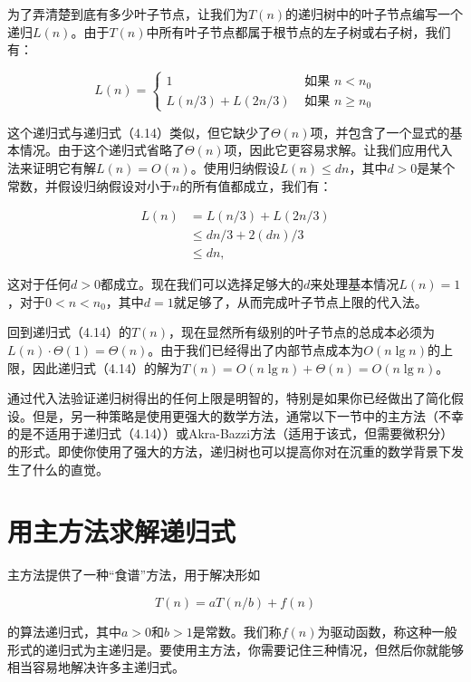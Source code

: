 \documentclass[lang=cn,newtx,10pt,scheme=chinese]{elegantbook}
\begin{document}
为了弄清楚到底有多少叶子节点，让我们为$T(n)$的递归树中的叶子节点编写一个递归$L(n)$。由于$T(n)$中所有叶子节点都属于根节点的左子树或右子树，我们有：

\begin{equation}
L(n)= \begin{cases}1 & \text { 如果 } n<n_0 \\ L(n / 3)+L(2 n / 3) & \text { 如果 } n \geq n_0\end{cases}
\end{equation}

这个递归式与递归式（4.14）类似，但它缺少了$\Theta(n)$项，并包含了一个显式的基本情况。由于这个递归式省略了$\Theta(n)$项，因此它更容易求解。让我们应用代入法来证明它有解$L(n)=O(n)$。使用归纳假设$L(n) \leq d n$，其中$d>0$是某个常数，并假设归纳假设对小于$n$的所有值都成立，我们有：

$$
\begin{aligned}
L(n) & =L(n / 3)+L(2 n / 3) \\
& \leq d n / 3+2(d n) / 3 \\
& \leq d n,
\end{aligned}
$$

这对于任何$d>0$都成立。现在我们可以选择足够大的$d$来处理基本情况$L(n)=1$，对于$0<n<n_0$，其中$d=1$就足够了，从而完成叶子节点上限的代入法。

回到递归式（4.14）的$T(n)$，现在显然所有级别的叶子节点的总成本必须为$L(n) \cdot \Theta(1)=\Theta(n)$。由于我们已经得出了内部节点成本为$O(n \lg n)$的上限，因此递归式（4.14）的解为$T(n)=O(n \lg n)+\Theta(n)=O(n \lg n)$。

通过代入法验证递归树得出的任何上限是明智的，特别是如果你已经做出了简化假设。但是，另一种策略是使用更强大的数学方法，通常以下一节中的主方法（不幸的是不适用于递归式（4.14））或Akra-Bazzi方法（适用于该式，但需要微积分）的形式。即使你使用了强大的方法，递归树也可以提高你对在沉重的数学背景下发生了什么的直觉。

\section{用主方法求解递归式}\label{section-4.5}

主方法提供了一种“食谱”方法，用于解决形如

\begin{equation}
T(n)=aT(n/b)+f(n)
\end{equation}

的算法递归式，其中$a>0$和$b>1$是常数。我们称$f(n)$为驱动函数，称这种一般形式的递归式为主递归是。要使用主方法，你需要记住三种情况，但然后你就能够相当容易地解决许多主递归式。
\end{document}
